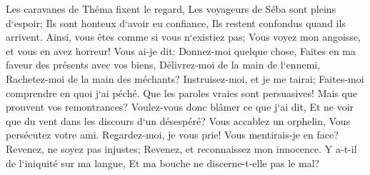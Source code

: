 \verse Les caravanes de Théma fixent le regard, Les voyageurs de Séba sont pleins d`espoir; 
\verse Ils sont honteux d`avoir eu confiance, Ils restent confondus quand ils arrivent. 
\verse Ainsi, vous êtes comme si vous n`existiez pas; Vous voyez mon angoisse, et vous en avez horreur! 
\verse Vous ai-je dit: Donnez-moi quelque chose, Faites en ma faveur des présents avec vos biens, 
\verse Délivrez-moi de la main de l`ennemi, Rachetez-moi de la main des méchants? 
\verse Instruisez-moi, et je me tairai; Faites-moi comprendre en quoi j`ai péché. 
\verse Que les paroles vraies sont persuasives! Mais que prouvent vos remontrances? 
\verse Voulez-vous donc blâmer ce que j`ai dit, Et ne voir que du vent dans les discours d`un désespéré? 
\verse Vous accablez un orphelin, Vous persécutez votre ami. 
\verse Regardez-moi, je vous prie! Vous mentirais-je en face? 
\verse Revenez, ne soyez pas injustes; Revenez, et reconnaissez mon innocence. 
\verse Y a-t-il de l`iniquité sur ma langue, Et ma bouche ne discerne-t-elle pas le mal? 

